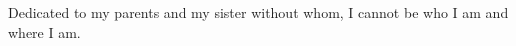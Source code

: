 
\cleardoublepage
{}
\thispagestyle{empty}

\vspace*{3cm}


\medskip

\begin{center}
Dedicated to my parents and my sister without whom, I cannot be who I am and where I am.
\end{center}
